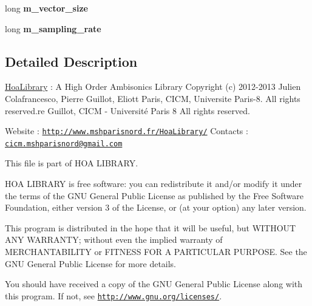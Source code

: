 \begin{DoxyCompactItemize}
\item 
\hypertarget{class_planewaves_a0980687d11060fab5714954390e71588}{long {\bfseries m\-\_\-vector\-\_\-size}}\label{class_planewaves_a0980687d11060fab5714954390e71588}

\item 
\hypertarget{class_planewaves_a54f363a918f24543a4584263ff6b4eba}{long {\bfseries m\-\_\-sampling\-\_\-rate}}\label{class_planewaves_a54f363a918f24543a4584263ff6b4eba}

\end{DoxyCompactItemize}


\subsection{Detailed Description}
\hyperlink{interface_hoa_library}{Hoa\-Library} \-: A High Order Ambisonics Library Copyright (c) 2012-\/2013 Julien Colafrancesco, Pierre Guillot, Eliott Paris, C\-I\-C\-M, Universite Paris-\/8. All rights reserved.\-re Guillot, C\-I\-C\-M -\/ Université Paris 8 All rights reserved.

Website \-: \href{http://www.mshparisnord.fr/HoaLibrary/}{\tt http\-://www.\-mshparisnord.\-fr/\-Hoa\-Library/} Contacts \-: \href{mailto:cicm.mshparisnord@gmail.com}{\tt cicm.\-mshparisnord@gmail.\-com}

This file is part of H\-O\-A L\-I\-B\-R\-A\-R\-Y.

H\-O\-A L\-I\-B\-R\-A\-R\-Y is free software\-: you can redistribute it and/or modify it under the terms of the G\-N\-U General Public License as published by the Free Software Foundation, either version 3 of the License, or (at your option) any later version.

This program is distributed in the hope that it will be useful, but W\-I\-T\-H\-O\-U\-T A\-N\-Y W\-A\-R\-R\-A\-N\-T\-Y; without even the implied warranty of M\-E\-R\-C\-H\-A\-N\-T\-A\-B\-I\-L\-I\-T\-Y or F\-I\-T\-N\-E\-S\-S F\-O\-R A P\-A\-R\-T\-I\-C\-U\-L\-A\-R P\-U\-R\-P\-O\-S\-E. See the G\-N\-U General Public License for more details.

You should have received a copy of the G\-N\-U General Public License along with this program. If not, see \href{http://www.gnu.org/licenses/}{\tt http\-://www.\-gnu.\-org/licenses/}. 

